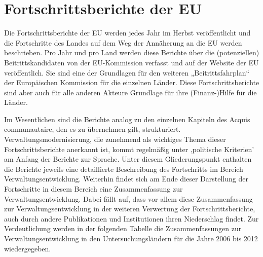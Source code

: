 \section{Fortschrittsberichte der EU}
Die Fortschrittsberichte der EU werden jedes Jahr im Herbst veröffentlicht und die Fortschritte des Landes auf dem Weg der Annäherung an die EU werden beschrieben. Pro Jahr und pro Land werden diese Berichte über die (potenziellen) Beitrittskandidaten von der EU-Kommission verfasst und auf der Website der EU veröffentlich. Sie sind eine der Grundlagen für den weiteren „Beitrittsfahrplan“ der Europäischen Kommission für die einzelnen Länder. Diese Fortschrittsberichte sind aber auch für alle anderen Akteure Grundlage für ihre (Finanz-)Hilfe für die Länder.\par
Im Wesentlichen sind die Berichte analog zu den einzelnen Kapiteln des Acquis communautaire, den es zu übernehmen gilt, strukturiert. Verwaltungsmodernisierung, die zunehmend als wichtiges Thema dieser Fortschrittsberichte anerkannt ist, kommt regelmäßig unter ‚politische Kriterien’ am Anfang der Berichte zur Sprache. Unter diesem Gliederungspunkt enthalten die Berichte jeweils eine detaillierte Beschreibung des Fortschritts im Bereich Verwaltungsentwicklung. Weiterhin findet sich am Ende dieser Darstellung der Fortschritte in diesem Bereich eine Zusammenfassung zur Verwaltungsentwicklung. Dabei fällt auf, dass vor allem diese Zusammenfassung zur Verwaltungsentwicklung in der weiteren Verwertung der Fortschrittsberichte, auch durch andere Publikationen und Institutionen ihren Niederschlag findet. Zur Verdeutlichung werden in der folgenden Tabelle die Zusammenfassungen zur Verwaltungsentwicklung in den Untersuchungsländern für die Jahre 2006 bis 2012 wiedergegeben.

